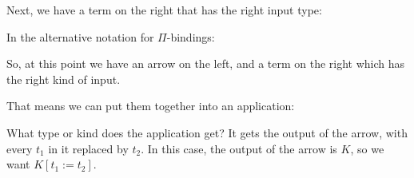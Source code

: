 \documentclass{book}
\numberwithin{equation}{chapter}
\begin{document}
\begin{prooftree}
\end{prooftree}

\noindent
Next, we have a term on the right that has the right input type:

\begin{prooftree}
\end{prooftree}

\noindent
In the alternative notation for $\Pi$-bindings:

\begin{prooftree}
\end{prooftree}

\noindent
So, at this point we have an arrow on the left, and a term on the right which has the right kind of input. 

\begin{prooftree}
\end{prooftree}

\noindent
That means we can put them together into an application:

\begin{prooftree}
\end{prooftree}

\noindent
What type or kind does the application get? It gets the output of the arrow, with every $t_{1}$ in it replaced by $t_{2}$. In this case, the output of the arrow is $K$, so we want $K[t_{1} := t_{2}]$.

\begin{prooftree}
\end{prooftree}
\end{document}
